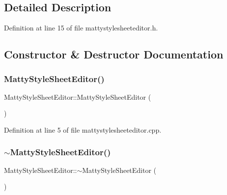 \subsection{Detailed Description}


Definition at line 15 of file mattystylesheeteditor.\+h.



\subsection{Constructor \& Destructor Documentation}
\hypertarget{classMattyStyleSheetEditor_ad99a6c56d91fcc24dc8e36bfbe34eda9}{}\label{classMattyStyleSheetEditor_ad99a6c56d91fcc24dc8e36bfbe34eda9} 
\subsubsection{\texorpdfstring{Matty\+Style\+Sheet\+Editor()}{MattyStyleSheetEditor()}}
{\footnotesize\ttfamily Matty\+Style\+Sheet\+Editor\+::\+Matty\+Style\+Sheet\+Editor (\begin{DoxyParamCaption}{ }\end{DoxyParamCaption})}



Definition at line 5 of file mattystylesheeteditor.\+cpp.

\hypertarget{classMattyStyleSheetEditor_a53d519a70068544b30fb38db6eaf86a4}{}\label{classMattyStyleSheetEditor_a53d519a70068544b30fb38db6eaf86a4} 
\subsubsection{\texorpdfstring{$\sim$\+Matty\+Style\+Sheet\+Editor()}{~MattyStyleSheetEditor()}}
{\footnotesize\ttfamily Matty\+Style\+Sheet\+Editor\+::$\sim$\+Matty\+Style\+Sheet\+Editor (\begin{DoxyParamCaption}{ }\end{DoxyParamCaption})}



